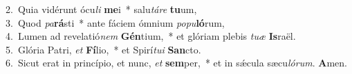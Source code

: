 {2.~}Quia vidérunt ócu\textit{li} \textbf{me}i~* salu\textit{tá}\textit{re} \textbf{tu}um,\\
{3.~}Quod \textit{pa}\textbf{rá}sti~* ante fáciem ómnium \textit{po}\textit{pu}\textbf{ló}rum,\\
{4.~}Lumen ad revelatió\textit{nem} \textbf{Gén}tium,~* et glóriam plebis \textit{tu}\textit{æ} \textbf{Is}raël.\\
{5.~}Glória Patri, \textit{et} \textbf{Fí}lio,~* et Spirí\textit{tu}\textit{i} \textbf{San}cto.\\
{6.~}Sicut erat in princípio, et nunc, \textit{et} \textbf{sem}per,~* et in sǽcula sæcu\textit{ló}\textit{rum}. \textbf{A}men.\\
